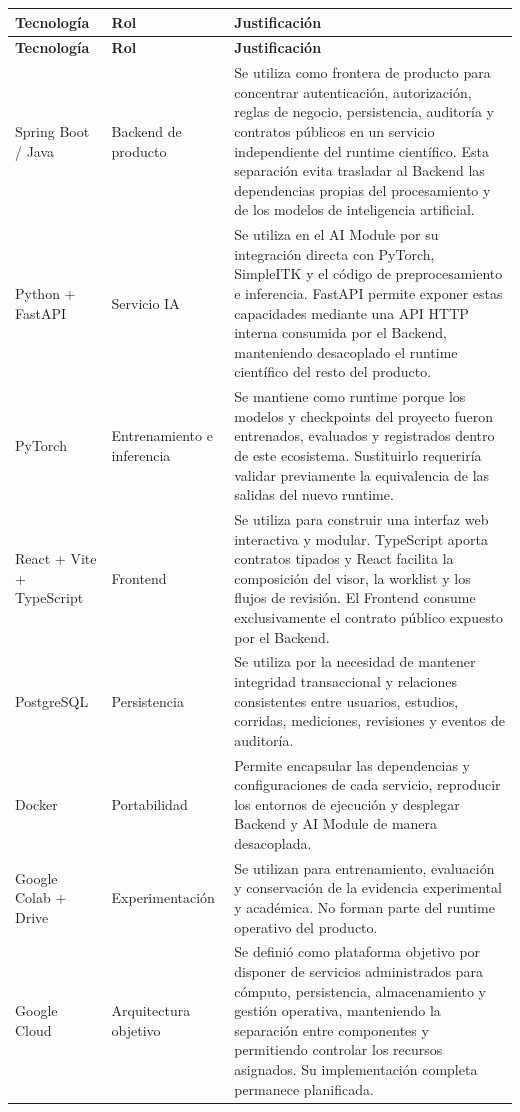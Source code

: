 {\footnotesize
\setlength{\LTleft}{0pt}
\setlength{\LTright}{0pt}
\setlength{\tabcolsep}{2pt}
\renewcommand{\arraystretch}{1.18}
\label{tab:arch-tecnologias}
\begin{longtable}{>{\raggedright\arraybackslash}p{} >{\raggedright\arraybackslash}p{} >{\raggedright\arraybackslash}p{}}
\hline
\textbf{Tecnología} & \textbf{Rol} & \textbf{Justificación} \\
\hline
\endfirsthead
\hline
\textbf{Tecnología} & \textbf{Rol} & \textbf{Justificación} \\
\hline
\endhead
\hline
\endfoot
Spring Boot / Java & Backend de producto & Se utiliza como frontera de producto para concentrar autenticación, autorización, reglas de negocio, persistencia, auditoría y contratos públicos en un servicio independiente del runtime científico. Esta separación evita trasladar al Backend las dependencias propias del procesamiento y de los modelos de inteligencia artificial. \\
Python + FastAPI & Servicio IA & Se utiliza en el AI Module por su integración directa con PyTorch, SimpleITK y el código de preprocesamiento e inferencia. FastAPI permite exponer estas capacidades mediante una API HTTP interna consumida por el Backend, manteniendo desacoplado el runtime científico del resto del producto. \\
PyTorch & Entrenamiento e inferencia & Se mantiene como runtime porque los modelos y checkpoints del proyecto fueron entrenados, evaluados y registrados dentro de este ecosistema. Sustituirlo requeriría validar previamente la equivalencia de las salidas del nuevo runtime. \\
React + Vite + TypeScript & Frontend & Se utiliza para construir una interfaz web interactiva y modular. TypeScript aporta contratos tipados y React facilita la composición del visor, la worklist y los flujos de revisión. El Frontend consume exclusivamente el contrato público expuesto por el Backend. \\
PostgreSQL & Persistencia & Se utiliza por la necesidad de mantener integridad transaccional y relaciones consistentes entre usuarios, estudios, corridas, mediciones, revisiones y eventos de auditoría. \\
Docker & Portabilidad & Permite encapsular las dependencias y configuraciones de cada servicio, reproducir los entornos de ejecución y desplegar Backend y AI Module de manera desacoplada. \\
Google Colab + Drive & Experimentación & Se utilizan para entrenamiento, evaluación y conservación de la evidencia experimental y académica. No forman parte del runtime operativo del producto. \\
Google Cloud & Arquitectura objetivo & Se definió como plataforma objetivo por disponer de servicios administrados para cómputo, persistencia, almacenamiento y gestión operativa, manteniendo la separación entre componentes y permitiendo controlar los recursos asignados. Su implementación completa permanece planificada. \\
\hline
\end{longtable}
}

